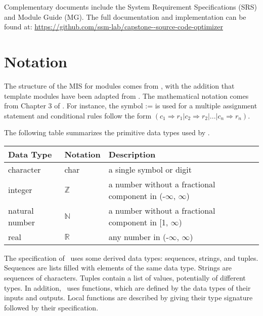 \documentclass[12pt, titlepage]{article}
\begin{document}
Complementary documents include the System Requirement Specifications (SRS) and Module Guide (MG). The full documentation and implementation can be found at: \url{https://github.com/ssm-lab/capstone--source-code-optimizer}

\section{Notation}


The structure of the MIS for modules comes from \citet{HoffmanAndStrooper1995},
with the addition that template modules have been adapted from
\cite{GhezziEtAl2003}.  The mathematical notation comes from Chapter 3 of
\citet{HoffmanAndStrooper1995}.  For instance, the symbol := is used for a
multiple assignment statement and conditional rules follow the form $(c_1
\Rightarrow r_1 | c_2 \Rightarrow r_2 | ... | c_n \Rightarrow r_n )$.

The following table summarizes the primitive data types used by \progname. 

\begin{center}
\renewcommand{\arraystretch}{1.2}
\noindent 
\begin{tabular}{l l p{7.5cm}} 
\toprule 
\textbf{Data Type} & \textbf{Notation} & \textbf{Description}\\ 
\midrule
character & char & a single symbol or digit\\
integer & $\mathbb{Z}$ & a number without a fractional component in (-$\infty$, $\infty$) \\
natural number & $\mathbb{N}$ & a number without a fractional component in [1, $\infty$) \\
real & $\mathbb{R}$ & any number in (-$\infty$, $\infty$)\\
\bottomrule
\end{tabular} 
\end{center}

\noindent
The specification of \progname \ uses some derived data types: sequences, strings, and
tuples. Sequences are lists filled with elements of the same data type. Strings
are sequences of characters. Tuples contain a list of values, potentially of
different types. In addition, \progname \ uses functions, which
are defined by the data types of their inputs and outputs. Local functions are
described by giving their type signature followed by their specification.
\end{document}
